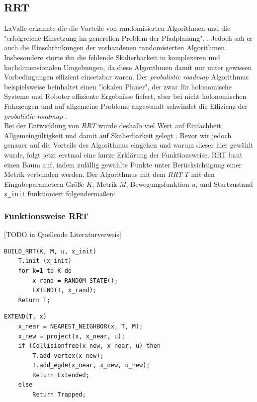 \subsection{RRT}
\label{RRT}
LaValle erkannte die die Vorteile von randomisierten Algorithmen und die "erfolgreiche Einsetzung im generellen Problem der Pfadplanung". \citep[Kap 1][]{Lav98}. Jedoch sah er auch die Einschränkungen der vorhandenen randomisierten Algorithmen. Insbesondere störte ihn die fehlende Skalierbarkeit in komplexeren und hochdimensionalen Umgebungen, da diese Algorithmen damit nur unter gewissen Vorbedingungen effizient einsetzbar waren. Der \textit{probalistic roadmap} Algorithmus \citep{AmWu96} beispielsweise beinhaltet einen "lokalen Planer", der zwar für holonomische Systeme und Roboter effiziente Ergebnisse liefert, aber bei nicht holonomischen Fahrzeugen und auf allgemeine Probleme angewandt schwindet die Effizienz der \textit{probalistic roadmap} \citep{Lav98} .\\
Bei der Entwicklung von \textit{RRT} wurde deshalb viel Wert auf Einfachheit, Allgemeingültigkeit und damit auf Skalierbarkeit gelegt \citep[vlg. Kap 3][]{Lav98}. Bevor wir jedoch genauer auf die Vorteile des Algorithmus eingehen und warum dieser hier gewählt wurde, folgt jetzt erstmal eine kurze Erklärung der Funktionsweise. RRT baut einen Baum auf, indem zufällig gewählte Punkte unter Berücksichtigung einer Metrik verbunden werden. Der Algorithmus mit dem \textit{RRT} $T$ mit den Eingabeparametern Größe $K$, Metrik $M$, Bewegungsfunktion $u$, und Startzustand \verb|x_init|  funktioniert folgendermaßen:

\subsubsection{Funktionsweise RRT}
[TODO in Quellcode Literaturverweis]
\lstset{language=Pascal, stepnumber=1, numbers=left}
\begin{lstlisting}
BUILD_RRT(K, M, u, x_init)
	T.init (x_init)
	for k=1 to K do
		x_rand = RANDOM_STATE();
		EXTEND(T, x_rand);
	Return T;
\end{lstlisting}
\begin{lstlisting}
EXTEND(T, x)
	x_near = NEAREST_NEIGHBOR(x, T, M);
	x_new = project(x, x_near, u);
	if (Collisionfree(x_new, x_near, u) then
		T.add_vertex(x_new);
		T.add_egde(x_near, x_new, u_new);
		Return Extended;
	else
		Return Trapped;
\end{lstlisting}

